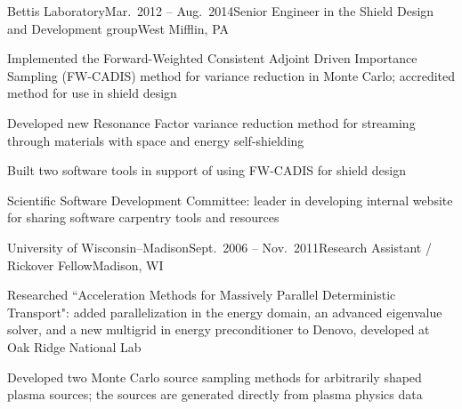 
\begin{rSubsection}{Bettis Laboratory}{Mar.\ 2012 -- Aug.\ 2014}{Senior Engineer in the Shield Design and Development group}{West Mifflin, PA}
\item Implemented the Forward-Weighted Consistent Adjoint Driven Importance Sampling (FW-CADIS) method for variance reduction in Monte Carlo; accredited method for use in shield design
\item Developed new Resonance Factor variance reduction method for streaming through materials with space and energy self-shielding
\item Built two software tools in support of using FW-CADIS for shield design
\item Scientific Software Development Committee: leader in developing internal website for sharing software carpentry tools and resources
\end{rSubsection}

\clearpage
\begin{rSubsection}{University of Wisconsin--Madison}{Sept.\ 2006 -- Nov.\ 2011}{Research Assistant / Rickover Fellow}{Madison, WI}
\item Researched ``Acceleration Methods for Massively Parallel Deterministic Transport": added parallelization in the energy domain, an advanced eigenvalue solver, and a new multigrid in energy preconditioner to Denovo, developed at Oak Ridge National Lab
\item Developed two Monte Carlo source sampling methods for arbitrarily shaped plasma sources; the sources are generated directly from plasma physics data
\end{rSubsection}



